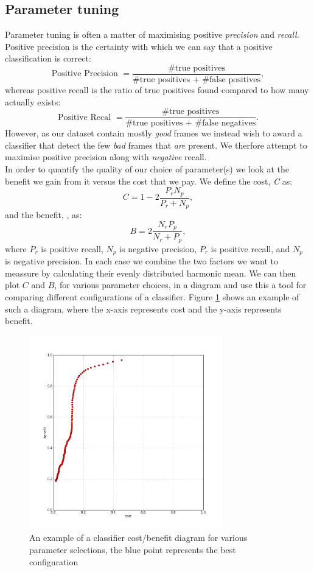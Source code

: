 \subsection{Parameter tuning}\label{sec:ph1tweaking}
%
Parameter tuning is often a matter of maximising positive \textit{precision} and \textit{recall}. Positive precision is the certainty with which we can say that a positive classification is correct:
\[
\text{Positive Precision } = \frac{\text{\#true positives}}{\text{\#true positives + \#false positives}},
\]
whereas positive recall is the ratio of true positives found compared to how many actually exists:
\[
\text{Positive Recal } = \frac{\text{\#true positives}}{\text{\#true positives + \#false negatives}}.
\]
%
However, as our dataset contain mostly \textit{good} frames we instead wish to award a classifier that detect the few \textit{bad} frames that \textit{are} present. We therfore attempt to maximise positive precision along with \textit{negative} recall.\\
In order to quantify the quality of our choice of parameter(s) we look at the benefit we gain from it versus the cost that we pay. We define the cost, \textit{C} as:
%
\[
C = 1 - 2\frac{P_{r}N_{p}}{P_{r} + N_{p}},
\]
%
and the benefit, , as:
%
\[
B = 2\frac{N_{r} P_{p}}{N_{r} + P_{p}},
\]
%
where $P_r$ is positive recall, $N_p$ is negative precision, $P_r$ is positive recall, and $N_p$ is negative precision. In each case we combine the two factors we want to meassure by calculating their evenly distributed harmonic mean. We can then plot $C$ and $B$, for various parameter choices, in a diagram and use this a tool for comparing different configurations of a classifier. Figure \ref{fig:costbenefitdiagram} shows an example of such a diagram, where the x-axis represents cost and the y-axis represents benefit.
%
\begin{figure}
     \centering
     \includegraphics[width=0.75\textwidth]{img/2dcostbenefitexample2.jpg}
     \caption{An example of a classifier cost/benefit diagram for various parameter selections, the blue point represents the best configuration}
     \label{fig:costbenefitdiagram}
\end{figure}
